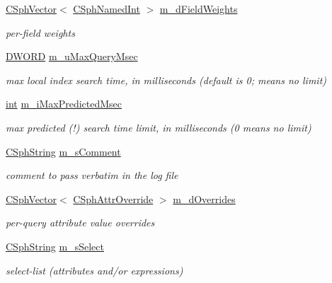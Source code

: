 \begin{DoxyCompactItemize}
\hyperlink{classCSphVector}{C\-Sph\-Vector}$<$ \hyperlink{structCSphNamedInt}{C\-Sph\-Named\-Int} $>$ \hyperlink{classCSphQuery_a8741671a2fc4c617f23d4c8e2eec0392}{m\-\_\-d\-Field\-Weights}
\begin{DoxyCompactList}\small\item\em per-\/field weights \end{DoxyCompactList}\item 
\hyperlink{sphinxstd_8h_a798af1e30bc65f319c1a246cecf59e39}{D\-W\-O\-R\-D} \hyperlink{classCSphQuery_a2b9c353ae3e5ad81b62c6de63918260b}{m\-\_\-u\-Max\-Query\-Msec}
\begin{DoxyCompactList}\small\item\em max local index search time, in milliseconds (default is 0; means no limit) \end{DoxyCompactList}\item 
\hyperlink{sphinxexpr_8cpp_a4a26e8f9cb8b736e0c4cbf4d16de985e}{int} \hyperlink{classCSphQuery_a185042a2181d82c8d67b7ef14b399f90}{m\-\_\-i\-Max\-Predicted\-Msec}
\begin{DoxyCompactList}\small\item\em max predicted (!) search time limit, in milliseconds (0 means no limit) \end{DoxyCompactList}\item 
\hyperlink{structCSphString}{C\-Sph\-String} \hyperlink{classCSphQuery_a579757d29ee1b6cf6483326f8a8f4178}{m\-\_\-s\-Comment}
\begin{DoxyCompactList}\small\item\em comment to pass verbatim in the log file \end{DoxyCompactList}\item 
\hyperlink{classCSphVector}{C\-Sph\-Vector}$<$ \hyperlink{classCSphAttrOverride}{C\-Sph\-Attr\-Override} $>$ \hyperlink{classCSphQuery_ab2f5d9d2129f4916c24df3b7ce34a08a}{m\-\_\-d\-Overrides}
\begin{DoxyCompactList}\small\item\em per-\/query attribute value overrides \end{DoxyCompactList}\item 
\hyperlink{structCSphString}{C\-Sph\-String} \hyperlink{classCSphQuery_a6376053048cd37a5fbceb32b636a9051}{m\-\_\-s\-Select}
\begin{DoxyCompactList}\small\item\em select-\/list (attributes and/or expressions) \end{DoxyCompactList}\item 

\end{DoxyCompactItemize}
